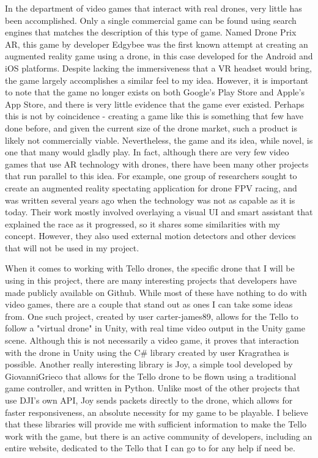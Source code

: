 \documentclass[10pt,twocolumn]{article}
\begin{document}
In the department of video games that interact with real drones, very little has been accomplished. Only a single commercial game can be found using search engines that matches the description of this type of game. Named Drone Prix AR\cite{DronePrixAR}, this game by developer Edgybee was the first known attempt at creating an augmented reality game using a drone, in this case developed for the Android and iOS platforms. Despite lacking the immersiveness that a VR headset would bring, the game largely accomplishes a similar feel to my idea. However, it is important to note that the game no longer exists on both Google’s Play Store and Apple’s App Store, and there is very little evidence that the game ever existed. Perhaps this is not by coincidence - creating a game like this is something that few have done before, and given the current size of the drone market, such a product is likely not commercially viable. Nevertheless, the game and its idea, while novel, is one that many would gladly play.  In fact, although there are very few video games that use AR technology with drones, there have been many other projects that run parallel to this idea. For example, one group of researchers\cite{DroneARFPVReport} sought to create an augmented reality spectating application for drone FPV racing, and was written several years ago when the technology was not as capable as it is today. Their work mostly involved overlaying a visual UI and smart assistant that explained the race as it progressed, so it shares some similarities with my concept. However, they also used external motion detectors and other devices that will not be used in my project.

When it comes to working with Tello drones, the specific drone that I will be using in this project, there are many interesting projects that developers have made publicly available on Github. While most of these have nothing to do with video games, there are a couple that stand out as ones I can take some ideas from. One such project, created by user carter-james89\cite{TelloControllerGithub}, allows for the Tello to follow a "virtual drone" in Unity, with real time video output in the Unity game scene. Although this is not necessarily a video game, it proves that interaction with the drone in Unity using the C\# library\cite{TelloLibGithub} created by user Kragrathea is possible. Another really interesting library is Joy\cite{JoyGithub}, a simple tool developed by GiovanniGrieco that allows for the Tello drone to be flown using a traditional game controller, and written in Python. Unlike most of the other projects that use DJI's own API, Joy sends packets directly to the drone, which allows for faster responsiveness, an absolute necessity for my game to be playable. I believe that these libraries will provide me with sufficient information to make the Tello work with the game, but there is an active community of developers, including an entire website, dedicated to the Tello that I can go to for any help if need be.
\end{document}
